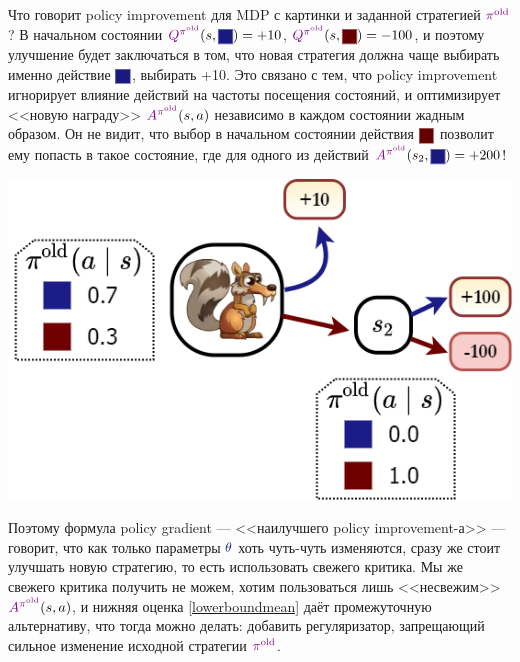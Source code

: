 \begin{exampleBox}[righthand ratio=0.4, sidebyside, sidebyside align=center, lower separated=false]{}
Что говорит policy improvement для MDP с картинки и заданной стратегией $\textcolor{ChadPurple}{\pi^{\old}}$? В начальном состоянии $\textcolor{ChadPurple}{Q^{\pi^{\old}}}(s, \colorsquare{ChadBlue}) \HM= +10$, $\textcolor{ChadPurple}{Q^{\pi^{\old}}}(s, \colorsquare{ChadRed}) \HM= -100$, и поэтому улучшение будет заключаться в том, что новая стратегия должна чаще выбирать именно действие $\colorsquare{ChadBlue}$, выбирать +10. Это связано с тем, что policy improvement игнорирует влияние действий на частоты посещения состояний, и оптимизирует <<новую награду>> $\textcolor{ChadPurple}{A^{\pi^{\old}}}(s, a)$ независимо в каждом состоянии жадным образом. Он не видит, что выбор в начальном состоянии действия $\colorsquare{ChadRed}$ позволит ему попасть в такое состояние, где для одного из действий $\textcolor{ChadPurple}{A^{\pi^{\old}}}(s_2, \colorsquare{ChadBlue}) \HM= +200$!

\tcblower
\vspace{-0.2cm}
\begin{adjustwidth}{-0.35cm}{0cm}
\includegraphics[width=\textwidth]{Images/GreedyPIisBad.png}
\end{adjustwidth}
\end{exampleBox}

Поэтому формула policy gradient --- <<наилучшего policy improvement-а>> --- говорит, что как только параметры $\textcolor{ChadBlue}{\theta}$ хоть чуть-чуть изменяются, сразу же стоит улучшать новую стратегию, то есть использовать свежего критика. Мы же свежего критика получить не можем, хотим пользоваться лишь <<несвежим>> $\textcolor{ChadPurple}{A^{\pi^{\old}}}(s, a)$, и нижняя оценка \eqref{lowerboundmean} даёт промежуточную альтернативу, что тогда можно делать: добавить регуляризатор, запрещающий сильное изменение исходной стратегии $\textcolor{ChadPurple}{\pi^{\old}}$.

